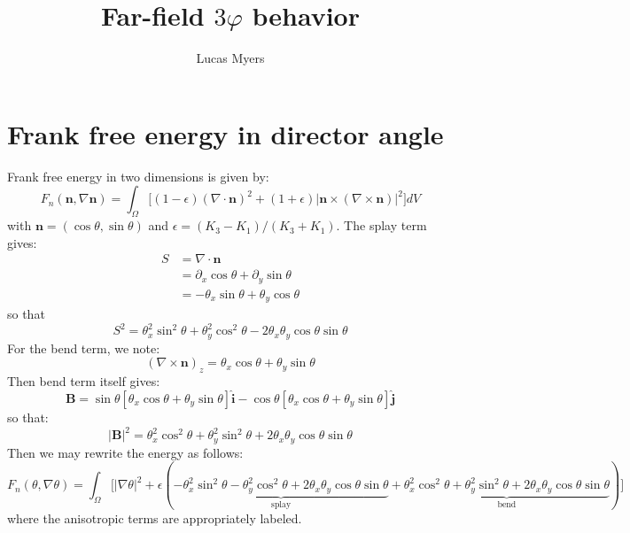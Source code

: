 \documentclass[reqno]{article}
\newcommand{\n}{\mathbf{n}}
\newcommand{\bend}{\mathbf{B}}
\newcommand{\ihat}{\mathbf{\hat{i}}}
\newcommand{\jhat}{\mathbf{\hat{j}}}
\begin{document}
\title{Far-field $3\varphi$ behavior}
\author{Lucas Myers}
\maketitle

\section{Frank free energy in director angle}

Frank free energy in two dimensions is given by:
\begin{equation}
    F_n(\n, \nabla \n)
    =
    \int_\Omega
    \biggl[
        (1 - \epsilon) \left(\nabla \cdot \n\right)^2
        + (1 + \epsilon) \left| \n \times \left( \nabla \times \n \right) \right|^2
    \biggr] dV
\end{equation}
with $\n = (\cos \theta, \sin\theta)$ and $\epsilon = (K_3 - K_1) / (K_3 + K_1)$.
The splay term gives:
\begin{equation}
\begin{split}
    S
    &=
    \nabla \cdot \n \\
    &=
    \partial_x \cos \theta + \partial_y \sin\theta \\
    &=
    -\theta_x \sin \theta + \theta_y \cos \theta
\end{split}
\end{equation}
so that
\begin{equation}
    S^2
    =
    \theta_x^2 \sin^2 \theta + \theta_y^2 \cos^2\theta  - 2 \theta_x \theta_y \cos\theta \sin\theta
\end{equation}
For the bend term, we note:
\begin{equation}
    \left(\nabla \times \n \right)_z
    =
    \theta_x \cos \theta + \theta_y \sin \theta
\end{equation}
Then bend term itself gives:
\begin{equation}
    \bend
    =
    \sin \theta \left[
        \theta_x \cos\theta + \theta_y \sin \theta
    \right] \ihat
    -
    \cos\theta \left[
        \theta_x \cos\theta + \theta_y \sin \theta
    \right] \jhat
\end{equation}
so that:
\begin{equation}
    \left|\bend\right|^2
    =
    \theta_x^2 \cos^2\theta
    + \theta_y^2 \sin^2\theta
    + 2\theta_x \theta_y \cos\theta \sin\theta
\end{equation}
Then we may rewrite the energy as follows:
\begin{equation}
    F_n(\theta, \nabla \theta)
    =
    \int_\Omega \biggl[
        \left|\nabla \theta \right|^2
        + \epsilon \left(
            \underbrace{
            -\theta_x^2 \sin^2\theta
            -\theta_y^2 \cos^2\theta
            + 2\theta_x \theta_y \cos\theta \sin\theta
            }_\text{splay}
            +
            \underbrace{
            \theta_x^2 \cos^2\theta
            + \theta_y^2 \sin^2\theta
            + 2\theta_x\theta_y\cos\theta\sin\theta
            }_\text{bend}
        \right)
    \biggr]
\end{equation}
where the anisotropic terms are appropriately labeled.
\end{document}
